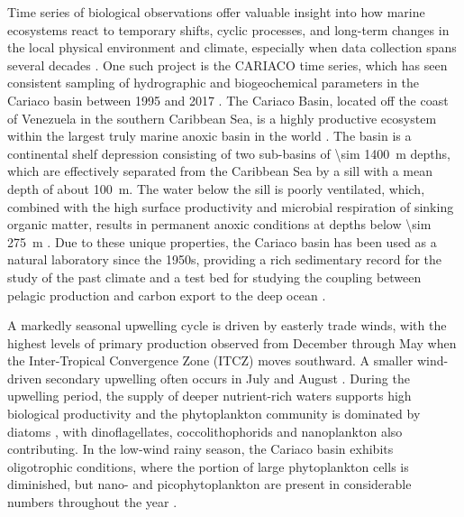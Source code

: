 \documentclass[draft]{agujournal2019}
\begin{document}
   
    Time series of biological observations offer valuable insight into how marine ecosystems react to temporary shifts, cyclic processes, and long-term changes in the local physical environment and climate, especially when data collection spans several decades \cite{carstensen_need_2014, henson_observing_2016}. 
    One such project is the CARIACO time series, which has seen consistent sampling of hydrographic and biogeochemical parameters in the Cariaco basin between 1995 and 2017 \cite{muller-karger_scientific_2019}. 
    The Cariaco Basin, located off the coast of Venezuela in the southern Caribbean Sea, is a highly productive ecosystem within the largest truly marine anoxic basin in the world \cite{edgcomb_accessing_2011}. The basin is a continental shelf depression consisting of two sub-basins of \qty{\sim 1400}{m} depths, which are effectively separated from the Caribbean Sea by a sill with a mean depth of about \qty{100}{m}. The water below the sill is poorly ventilated, which, combined with the high surface productivity and microbial respiration of sinking organic matter, results in permanent anoxic conditions at depths below \qty{\sim 275}{m} \cite{thunell_organic_2000}. Due to these unique properties, the Cariaco basin has been used as a natural laboratory since the 1950s, providing a rich sedimentary record for the study of the past climate \cite{hughen1996nature} and a test bed for studying the coupling between pelagic production and carbon export to the deep ocean \cite{montes_vertical_2012}.

    A markedly seasonal upwelling cycle is driven by easterly trade winds, with the highest levels of primary production observed from December through May when the Inter-Tropical Convergence Zone (ITCZ) moves southward. A smaller wind-driven secondary upwelling often occurs in July and August \cite{mullerkarger_annual_2001, astor_seasonal_2003}. During the upwelling period, the supply of deeper nutrient-rich waters supports high biological productivity and the phytoplankton community is dominated by diatoms \cite{romero_seasonal_2009}, with dinoflagellates, coccolithophorids and nanoplankton also contributing. In the low-wind rainy season, the Cariaco basin exhibits oligotrophic conditions, where the portion of large phytoplankton cells is diminished, but nano- and picophytoplankton are present in considerable numbers throughout the year \cite{lorenzoni_characterization_2015}.    
\end{document}

